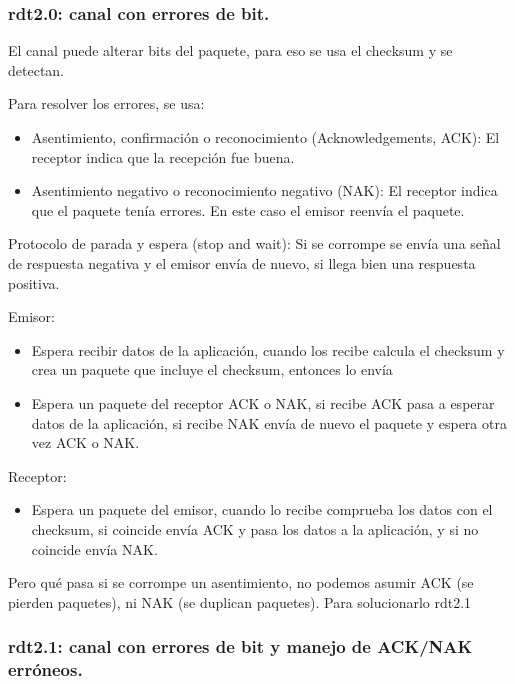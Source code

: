 \documentclass[12pt, twoside, openright]{report} %
\begin{document}
\subsubsection{rdt2.0: canal con errores de bit.}

El canal puede alterar bits del paquete, para eso se usa el
checksum y se detectan.

Para resolver los errores, se usa:

\begin{itemize}
	\item Asentimiento, confirmación o reconocimiento (Acknowledgements,
	      ACK): El receptor indica que la recepción fue buena.
	\item Asentimiento negativo o reconocimiento negativo (NAK): El
	      receptor indica que el paquete tenía errores. En este caso el
	      emisor reenvía el paquete.
\end{itemize}

Protocolo de parada y espera (stop and wait): Si se corrompe se
envía una señal de respuesta negativa y el emisor envía de nuevo,
si llega bien una respuesta positiva.
\begin{figure}[H]
	{\def\svgwidth{.9\textwidth}
		}
\end{figure}
Emisor:

\begin{itemize}
	\item Espera recibir datos de la aplicación, cuando los recibe calcula
	      el checksum y crea un paquete que incluye el checksum, entonces
	      lo envía
	\item Espera un paquete del receptor ACK o NAK, si recibe ACK pasa a
	      esperar datos de la aplicación, si recibe NAK envía de nuevo el
	      paquete y espera otra vez ACK o NAK.
\end{itemize}

Receptor:

\begin{itemize}
	\item Espera un paquete del emisor, cuando lo recibe comprueba los
	      datos con el checksum, si coincide envía ACK y pasa los datos a
	      la aplicación, y si no coincide envía NAK.
\end{itemize}

Pero qué pasa si se corrompe un asentimiento, no podemos asumir
ACK (se pierden paquetes), ni NAK (se duplican paquetes). Para
solucionarlo rdt2.1
\pagebreak
\subsubsection{rdt2.1: canal con errores de bit y manejo de ACK/NAK erróneos.}
\end{document}
